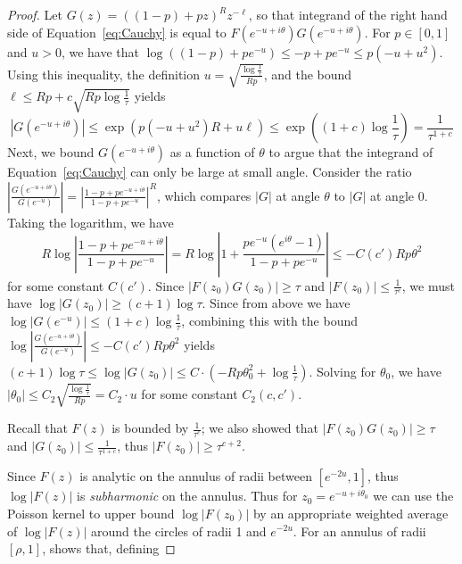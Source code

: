 \documentclass[11pt]{article}
\theoremstyle{plain}
\newcommand{\abs}[1]{\left|#1\right|}
\begin{document}
\begin{proof}
    Let $G(z) = ((1-p)+pz)^Rz^{-\ell}$, so that integrand of the right hand side of Equation~\ref{eq:Cauchy} is equal to $F(e^{-u+i\theta})G(e^{-u+i\theta})$. For $p \in [0,1]$ and $u > 0$, we have that $\log((1-p)+pe^{-u}) \leq -p + pe^{-u} \leq p(-u+u^2)$. Using this inequality, the definition $u=\sqrt{\frac{\log\frac{1}{\tau}}{R p}}$, and the bound $\ell \leq Rp + c\sqrt{Rp\log\frac{1}{\tau}}$ yields
    \begin{equation*}
        |G(e^{-u+i\theta})| \leq \exp(p(-u+u^2)R+u\ell) \leq \exp\left((1+c)\log\frac{1}{\tau}\right) = \frac{1}{\tau^{1+c}}
    \end{equation*}
    Next, we bound $G(e^{-u+i\theta})$ as a function of $\theta$ to argue that the integrand of Equation~\ref{eq:Cauchy} can only be large at small angle. Consider the ratio $\abs{\frac{G(e^{-u+i\theta})}{G(e^{-u})}} = \abs{\frac{1-p+pe^{-u+i\theta}}{1-p+pe^{-u}}}^R$, which compares $|G|$ at angle $\theta$ to $|G|$ at angle $0$. Taking the logarithm, we have
    \begin{equation*}
        R \log \abs{\frac{1-p+pe^{-u+i\theta}}{1-p+pe^{-u}}} = R \log \abs{1 + \frac{pe^{-u}(e^{i\theta} - 1)}{1-p+pe^{-u}}} \leq -C(c')Rp\theta^2 
    \end{equation*}
    for some constant $C(c')$.
    Since $|F(z_0)G(z_0)| \geq \tau$ and $|F(z_0)| \leq \frac{1}{\tau^c}$, we must have $\log |G(z_0)| \geq (c+1)\log \tau$. Since from above we have $\log |G(e^{-u})| \leq (1+c) \log \frac{1}{\tau}$, combining this with the bound  $\log\abs{\frac{G(e^{-u+i\theta})}{G(e^{-u})}}\leq -C(c')Rp\theta^2$ yields $(c+1)\log \tau \leq \log |G(z_0)| \leq C\cdot(-Rp\theta_0^2 + \log \frac{1}{\tau})$. Solving for $\theta_0$, we have $|\theta_0| \leq C_2\sqrt{\frac{\log \frac{1}{\tau}}{Rp}}=C_2 \cdot u$ for some constant $C_2(c,c')$.  

\medskip{}

Recall that $F(z)$ is bounded by $\frac{1}{\tau^c}$; we also showed that $|F(z_0)G(z_0)|\geq \tau$ and $|G(z_0)|\leq \frac{1}{\tau^{1+c}}$, thus $|F(z_0)|\geq \tau^{c+2}$.


Since $F(z)$ is analytic on the annulus of radii between $[e^{-2u},1]$, thus $\log|F(z)|$ is \emph{subharmonic} on the annulus. Thus for $z_0=e^{-u+i\theta_0 }$ we can use the Poisson kernel to upper bound $\log|F(z_0)|$ by an appropriate weighted average of $\log |F(z)|$ around the circles of radii 1 and $e^{-2u}$. For an annulus of radii $[\rho,1]$, 
\cite{Wang1983annulus} shows that, defining


\end{proof}
\end{document}
